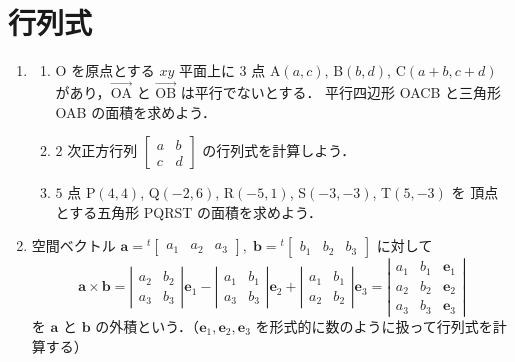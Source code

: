 \documentclass[11pt, uplatex, dvipdfmx]{jsarticle}
\renewcommand*{\vec}[1]{\overrightarrow{\textrm{#1}}}
\begin{document}
\newpage

\section{行列式}\label{sec:determinant}

\begin{enumerate}[label=\ref{sec:determinant}.\arabic*]
  \setlength{\itemsep}{1zh}
  
\item 

  \begin{enumerate}[label=(\arabic*)]
    \setlength{\itemsep}{1ex}
    
  \item O を原点とする $xy$ 平面上に $3$ 点 A$(a,c)$, B$(b,d)$,
    C$(a+b, c+d)$ があり，$\vec{OA}$ と $\vec{OB}$ は平行でないとする．
    平行四辺形 OACB と三角形 OAB の面積を求めよう．

  \item $2$ 次正方行列 $\left[
      \begin{array}{cc}
        a & b\\
        c & d
      \end{array}
    \right]$ の行列式を計算しよう．

  \item $5$ 点 P$(4,4)$, Q$(-2,6)$, R$(-5,1)$, S$(-3,-3)$, T$(5,-3)$ を
    頂点とする五角形 PQRST の面積を求めよう．
  \end{enumerate}

\item 空間ベクトル $\bm{a} = {}^{t}\left[
    \begin{array}{ccc}
      a_1 & a_2 & a_3
    \end{array}
  \right], \; \bm{b}=  {}^{t}\left[
    \begin{array}{ccc}
      b_1 & b_2 & b_3
    \end{array}
  \right]$ に対して
  \[
    \bm{a} \times \bm{b} = \left|
      \begin{array}{cc}
        a_2 & b_2\\
        a_3 & b_3
      \end{array}
    \right| \bm{e}_1 -\left|
      \begin{array}{cc}
        a_1 & b_1\\
        a_3 & b_3
      \end{array}
    \right|\bm{e}_2 + \left|
      \begin{array}{cc}
        a_1 & b_1\\
        a_2 & b_2
      \end{array}
    \right| \bm{e}_3 = \left|
      \begin{array}{ccc}
        a_1 & b_1 & \bm{e}_1\\
        a_2 & b_2 & \bm{e}_2\\
        a_3 & b_3 & \bm{e}_3
      \end{array}
    \right|
  \]
  を $\bm{a}$ と $\bm{b}$ の外積という．（$\bm{e}_1, \bm{e}_2,
  \bm{e}_3$ を形式的に数のように扱って行列式を計算する）


\end{enumerate}
\end{document}
